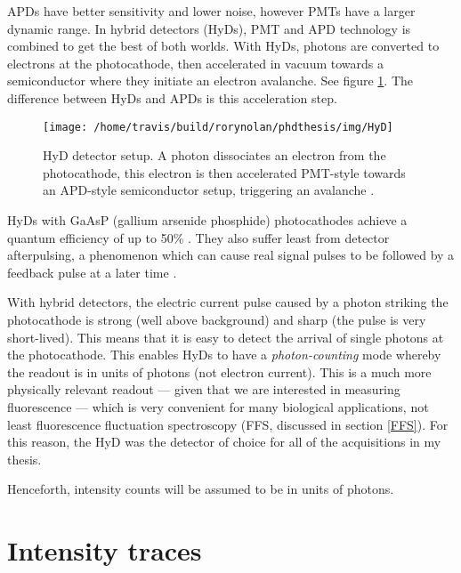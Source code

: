 \documentclass[12pt,]{book}
\theoremstyle{definition}
\theoremstyle{definition}
\theoremstyle{definition}
\theoremstyle{remark}
\let\BeginKnitrBlock\begin \let\EndKnitrBlock\end
\begin{document}
APDs have better sensitivity and lower noise, however PMTs have a larger
dynamic range. In hybrid detectors (HyDs), PMT and APD technology is
combined to get the best of both worlds. With HyDs, photons are
converted to electrons at the photocathode, then accelerated in vacuum
towards a semiconductor where they initiate an electron avalanche. See
figure \ref{fig:HyD}. The difference between HyDs and APDs is this
acceleration step.






\begin{figure}

\texttt{[image: /home/travis/build/rorynolan/phdthesis/img/HyD]} \hfill{}

\caption{HyD detector setup. A photon dissociates an electron
from the photocathode, this electron is then accelerated PMT-style
towards an APD-style semiconductor setup, triggering an avalanche
\citep{LeicaDetectors}.}\label{fig:HyD}
\end{figure}

HyDs with GaAsP (gallium arsenide phosphide) photocathodes achieve a
quantum efficiency of up to 50\% \citep{LeicaDetectors}. They also
suffer least from detector afterpulsing, a phenomenon which can cause
real signal pulses to be followed by a feedback pulse at a later time
\citep{afterpulsing}.

With hybrid detectors, the electric current pulse caused by a photon
striking the photocathode is strong (well above background) and sharp
(the pulse is very short-lived). This means that it is easy to detect
the arrival of single photons at the photocathode. This enables HyDs to
have a \emph{photon-counting} mode whereby the readout is in units of
photons (not electron current). This is a much more physically relevant
readout --- given that we are interested in measuring fluorescence ---
which is very convenient for many biological applications, not least
fluorescence fluctuation spectroscopy (FFS, discussed in section
\ref{FFS}). For this reason, the HyD was the detector of choice for all
of the acquisitions in my thesis.

\BeginKnitrBlock{remark}
\iffalse{} {Remark. } \fi{}Henceforth, intensity counts will be assumed
to be in units of photons.
\EndKnitrBlock{remark}

\section{Intensity traces}\label{intensity-traces}
\end{document}
